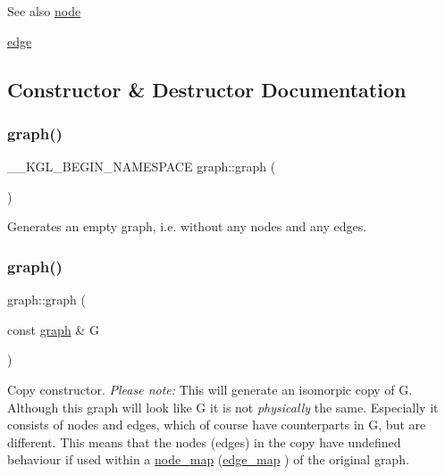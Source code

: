 \begin{DoxySeeAlso}{See also}
\mbox{\hyperlink{classnode}{node}} 

\mbox{\hyperlink{classedge}{edge}} 
\end{DoxySeeAlso}


\subsection{Constructor \& Destructor Documentation}
\mbox{\label{classgraph_a902c372b9d1835d07e0c62248b859356}} 
\subsubsection{\texorpdfstring{graph()}{graph()}\hspace{0.1cm}{\footnotesize\ttfamily [1/4]}}
{\footnotesize\ttfamily \+\_\+\+\_\+\+K\+G\+L\+\_\+\+B\+E\+G\+I\+N\+\_\+\+N\+A\+M\+E\+S\+P\+A\+CE graph\+::graph (\begin{DoxyParamCaption}{ }\end{DoxyParamCaption})}

Generates an empty graph, i.\+e. without any nodes and any edges. \mbox{\label{classgraph_a4339b04667a9977110e59a1326b0e2d5}} 
\subsubsection{\texorpdfstring{graph()}{graph()}\hspace{0.1cm}{\footnotesize\ttfamily [2/4]}}
{\footnotesize\ttfamily graph\+::graph (\begin{DoxyParamCaption}\item[{const \mbox{\hyperlink{classgraph}{graph}} \&}]{G }\end{DoxyParamCaption})}

Copy constructor. {\itshape Please note\+:} This will generate an isomorpic copy of {\ttfamily G}. Although this graph will look like {\ttfamily G} it is not {\itshape physically} the same. Especially it consists of nodes and edges, which of course have counterparts in {\ttfamily G}, but are different. This means that the nodes (edges) in the copy have undefined behaviour if used within a \mbox{\hyperlink{classnode__map}{node\+\_\+map}} (\mbox{\hyperlink{classedge__map}{edge\+\_\+map}} ) of the original graph.


